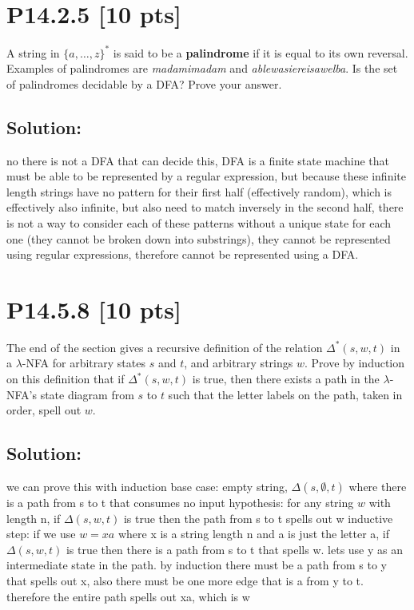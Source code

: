 \documentclass[12pt]{article}
\begin{document}
\newpage
\section*{\textbf{P14.2.5} [10 pts]}
A string in $\{a, \ldots , z\}^*$ is said to be a \textbf{palindrome} if it is equal to its own reversal. Examples of palindromes are \textit{madamimadam} and \textit{ablewasiereisawelba}. Is the set of palindromes decidable by a DFA? Prove your answer.


\subsection*{\textbf{Solution:}}

no there is not a DFA that can decide this, DFA is a finite state machine that must be able to be represented by a regular expression, but because these infinite length strings have no pattern for their first half (effectively random), which is effectively also infinite, but also need to match inversely in the second half, there is not a way to consider each of these patterns without a unique state for each one (they cannot be broken down into substrings), they cannot be represented using regular expressions, therefore cannot be represented using a DFA.
\newpage
\section*{\textbf{P14.5.8} [10 pts]}
The end of the section gives a recursive definition of the relation $\Delta^*(s, w, t)$ in a $\lambda$-NFA for arbitrary states $s$ and $t$, and arbitrary strings $w$. Prove by induction on this definition that if $\Delta^*(s, w, t)$ is true, then there exists a path in the $\lambda$-NFA’s state diagram from $s$ to $t$ such that the letter labels on the path, taken in order, spell out $w$.


\subsection*{\textbf{Solution:}}

we can prove this with induction\newline
base case: empty string, $\Delta(s, \emptyset, t)$ where there is a path from s to t that consumes no input\newline
hypothesis: for any string $w$ with length n, if $\Delta(s, w, t)$ is true then the path from s to t spells out w\newline
inductive step: if we use $w = xa$ where x is a string length n and a is just the letter a, if $\Delta(s, w, t)$ is true then there is a path from s to t that spells w. lets use y as an intermediate state in the path. by induction there must be a path from s to y that spells out x, also there must be one more edge that is a from y to t. therefore the entire path spells out xa, which is w
\end{document}
